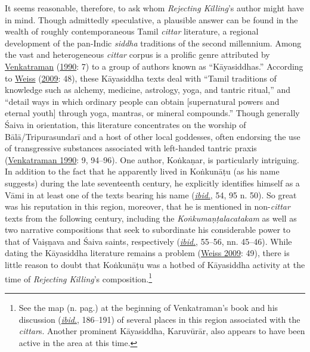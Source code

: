  It seems reasonable, therefore, to ask whom \emph{Rejecting Killing}’s author might have in mind. Though admittedly speculative, a plausible answer can be found in the wealth of roughly contemporaneous Tamil \emph{cittar} literature, a regional development of the pan-Indic \emph{siddha} traditions of the second millennium. Among the vast and heterogeneous \emph{cittar} corpus is a prolific genre attributed by \hyperref[Venkatraman1990]{Venkatraman} (\hyperref[Venkatraman1990]{1990}: 7) to a group of authors known as “Kāyasiddhas.” According to \hyperref[Weiss2009]{Weiss} (\hyperref[Weiss2009]{2009}: 48), these Kāyasiddha texts deal with “Tamil traditions of knowledge such as alchemy, medicine, astrology, yoga, and tantric ritual,” and “detail ways in which ordinary people can obtain [supernatural powers and eternal youth] through yoga, mantras, or mineral compounds.” Though generally Śaiva in orientation, this literature concentrates on the worship of Bālā/Tripurasundarī and a host of other local goddesses, often endorsing the use of transgressive substances associated with left-handed tantric praxis (\hyperref[Venkatraman1990]{Venkatraman 1990}: 9, 94–96). One author, Koṅkaṇar, is particularly intriguing. In addition to the fact that he apparently lived in Koṅkunāṭu (as his name suggests) during the late seventeenth century, he explicitly identifies himself as a Vāmi in at least one of the texts bearing his name (\hyperref[Venkatraman1990]{\emph{ibid}.}, 54, 95 n. 50). So great was his reputation in this region, moreover, that he is mentioned in non-\emph{cittar} texts from the following century, including the \emph{{Koṅkumaṇṭalacatakam}} as well as two narrative compositions that seek to subordinate his considerable power to that of Vaiṣṇava and Śaiva saints, respectively (\hyperref[Venkatraman1990]{\emph{ibid}.}, 55–56, nn. 45–46). While dating the Kāyasiddha literature remains a problem (\hyperref[Weiss2009]{Weiss 2009}: 49), there is little reason to doubt that Koṅkunāṭu was a hotbed of Kāyasiddha activity at the time of \emph{Rejecting Killing}’s composition.\footnote{%
See the map (n. pag.) at the beginning of Venkatraman’s book and his discussion (\hyperref[Venkatraman1990]{\emph{ibid}.}, 186–191) of several places in this region associated with the \emph{cittar}s. Another prominent Kāyasiddha, Karuvūrār, also appears to have been active in the area at this time. 
}



